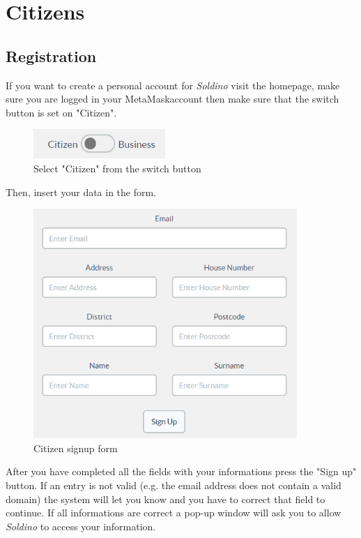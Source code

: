 \section{Citizens}
	\subsection{Registration}
	If you want to create a personal account for \textit{Soldino} visit the
	homepage, make sure you are logged in your MetaMask\glosp account
	then make sure that the switch button is set on "Citizen".\\
	\begin{figure}[H]
		\includegraphics[width=5cm]{res/images/user_citizen.png}
		\centering
		\caption{Select "Citizen" from the switch button}
	\end{figure}	
	\noindent Then, insert your data in the form. 
	\begin{figure}[H]
		\includegraphics[width=10cm]{res/images/citizen_signup.png}
		\centering
		\caption{Citizen signup form}
	\end{figure}
	\noindent After you have completed all the
	fields with your informations press the "Sign up" button. If an entry 
	is not valid (e.g. the email address does not contain a valid domain) 
	the system will let you know and you have to correct that field to continue.
	If all informations are correct a pop-up window will ask you 
	to allow \textit{Soldino} to access your information.\\
